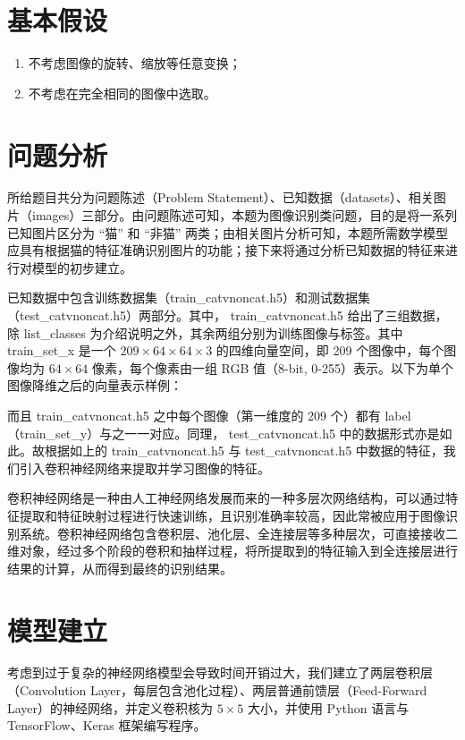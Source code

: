 \documentclass[UTF8]{ctexart}
\begin{document}
\section{基本假设}
\begin{enumerate}
\item 不考虑图像的旋转、缩放等任意变换；
\item 不考虑在完全相同的图像中选取。
\end{enumerate}

\section{问题分析}
所给题目共分为问题陈述（Problem Statement）、已知数据（datasets）、相关图片（images）三部分。由问题陈述可知，本题为图像识别类问题，目的是将一系列已知图片区分为 “猫” 和 “非猫” 两类；由相关图片分析可知，本题所需数学模型应具有根据猫的特征准确识别图片的功能；接下来将通过分析已知数据的特征来进行对模型的初步建立。

已知数据中包含训练数据集（train\_catvnoncat.h5）和测试数据集（test\_catvnoncat.h5）两部分。其中， train\_catvnoncat.h5 给出了三组数据，除 list\_classes 为介绍说明之外，其余两组分别为训练图像与标签。其中 train\_set\_x 是一个 $209 \times 64 \times 64 \times 3$ 的四维向量空间，即 209 个图像中，每个图像均为 $64 \times 64$ 像素，每个像素由一组 RGB 值（8-bit, 0-255）表示。以下为单个图像降维之后的向量表示样例：

而且 train\_catvnoncat.h5 之中每个图像（第一维度的 209 个）都有 label（train\_set\_y）与之一一对应。同理， test\_catvnoncat.h5 中的数据形式亦是如此。故根据如上的 train\_catvnoncat.h5 与 test\_catvnoncat.h5 中数据的特征，我们引入卷积神经网络来提取并学习图像的特征。

卷积神经网络是一种由人工神经网络发展而来的一种多层次网络结构，可以通过特征提取和特征映射过程进行快速训练，且识别准确率较高，因此常被应用于图像识别系统。卷积神经网络包含卷积层、池化层、全连接层等多种层次，可直接接收二维对象，经过多个阶段的卷积和抽样过程，将所提取到的特征输入到全连接层进行结果的计算，从而得到最终的识别结果。

\section{模型建立}
考虑到过于复杂的神经网络模型会导致时间开销过大，我们建立了两层卷积层（Convolution Layer，每层包含池化过程）、两层普通前馈层（Feed-Forward Layer）的神经网络，并定义卷积核为 $5 \times 5$ 大小，并使用 Python 语言与 TensorFlow、Keras 框架编写程序。
\end{document}
